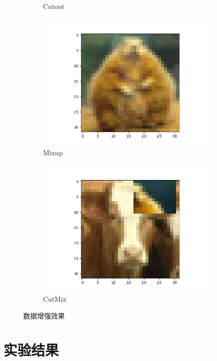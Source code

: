 \documentclass{article}
\begin{document}
\begin{figure}[h]
\begin{subfigure}{0.19\textwidth}
\caption{Cutout}
\end{subfigure}
\begin{subfigure}{0.19\textwidth}
\includegraphics[width=\linewidth]{figure/mixup2.png}
\caption{Mixup}
\end{subfigure}
\begin{subfigure}{0.19\textwidth}
\includegraphics[width=\linewidth]{figure/cutmix2.png}
\caption{CutMix}
\end{subfigure}
\caption{数据增强效果}
\label{fig:DA}
\end{figure}

\section{实验结果}
\end{document}
